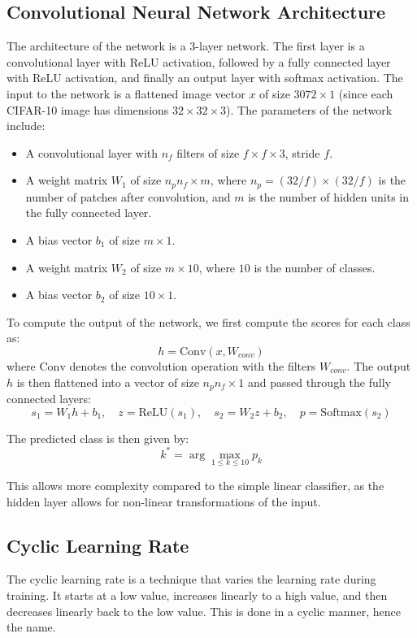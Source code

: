 \documentclass{article}
\begin{document}
\subsection{Convolutional Neural Network Architecture}
The architecture of the network is a 3-layer network. The first layer is a convolutional layer with ReLU activation, followed by a fully connected layer with ReLU activation, and finally an output layer with softmax activation.
The input to the network is a flattened image vector $x$ of size $3072 \times 1$ (since each CIFAR-10 image has dimensions $32 \times 32 \times 3$). The parameters of the network include:

\begin{itemize}
    \item A convolutional layer with $n_f$ filters of size $f \times f \times 3$, stride $f$.
    \item A weight matrix $W_1$ of size $n_p n_f \times m$, where $n_p = (32/f) \times (32/f)$ is the number of patches after convolution, and $m$ is the number of hidden units in the fully connected layer.
    \item A bias vector $b_1$ of size $m \times 1$.
    \item A weight matrix $W_2$ of size $m \times 10$, where $10$ is the number of classes.
    \item A bias vector $b_2$ of size $10 \times 1$.
\end{itemize}

To compute the output of the network, we first compute the scores for each class as:
\[h = \text{Conv}(x, W_{conv})\]
where $\text{Conv}$ denotes the convolution operation with the filters $W_{conv}$. The output $h$ is then flattened into a vector of size $n_p n_f \times 1$ and passed through the fully connected layers:
\[s_1 = W_1 h + b_1, \quad z = \text{ReLU}(s_1), \quad s_2 = W_2 z + b_2, \quad p = \text{Softmax}(s_2)\]

The predicted class is then given by:
\[
k^* = \arg\max_{1 \leq k \leq 10} p_k
\]

This allows more complexity compared to the simple linear classifier, as the hidden layer allows for non-linear transformations of the input.

\subsection{Cyclic Learning Rate}

The cyclic learning rate is a technique that varies the learning rate during training. It starts at a low value, increases linearly to a high value, and then decreases linearly back to the low value. This is done in a cyclic manner, hence the name.
\end{document}
